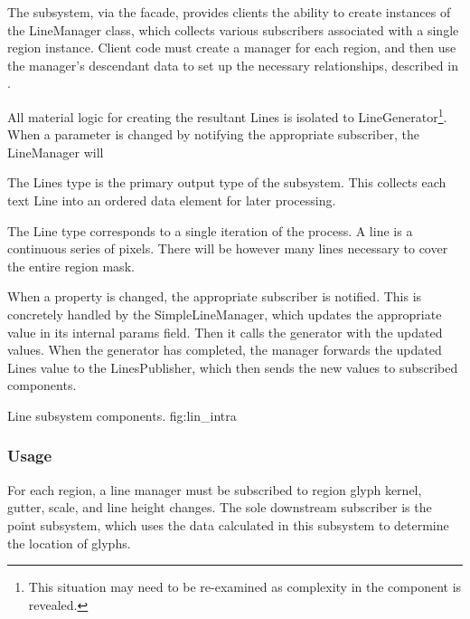 The subsystem, via the facade, provides clients the ability to create instances of the LineManager class, which collects various subscribers associated with a single region instance.
Client code must create a manager for each region, and then use the manager's descendant data to set up the necessary relationships, described in .

All material logic for creating the resultant Lines is isolated to LineGenerator\footnote{This situation may need to be re-examined as complexity in the component is revealed.}.
When a parameter is changed by notifying the appropriate subscriber, the LineManager will

The Lines type is the primary output type of the subsystem.
This collects each text Line into an ordered data element for later processing.

The Line type corresponds to a single iteration of the process.
A line is a continuous series of pixels.
There will be however many lines necessary to cover the entire region mask.

When a property is changed, the appropriate subscriber is notified.
This is concretely handled by the SimpleLineManager, which updates the appropriate value in its internal params field.
Then it calls the generator with the updated values.
When the generator has completed, the manager forwards the updated Lines value to the LinesPublisher, which then sends the new values to subscribed components.


{Line subsystem components.}
{fig:lin_intra}


\subsubsection{Usage}
\label{sec:line_usage}
For each region, a line manager must be subscribed to region glyph kernel, gutter, scale, and line height changes.
The sole downstream subscriber is the point subsystem, which uses the data calculated in this subsystem to determine the location of glyphs.